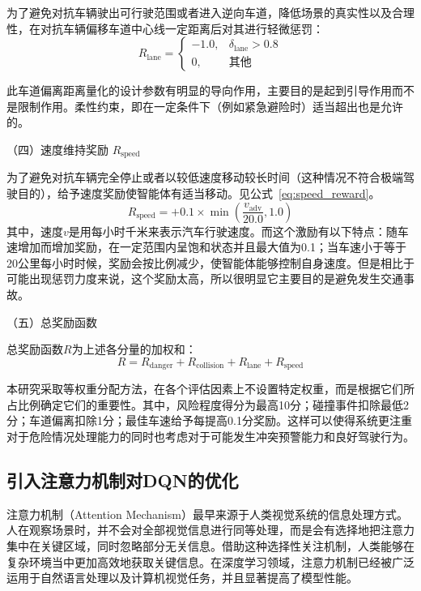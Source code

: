 为了避免对抗车辆驶出可行驶范围或者进入逆向车道，降低场景的真实性以及合理性，在对抗车辆偏移车道中心线一定距离后对其进行轻微惩罚：
\begin{equation}
R_{\text{lane}} =
\begin{cases}
-1.0, & \delta_{\text{lane}} > 0.8 \\
0, & \text{其他}
\end{cases}
\label{eq:lane_penalty}
\end{equation}

此车道偏离距离量化的设计参数有明显的导向作用，主要目的是起到引导作用而不是限制作用。柔性约束，即在一定条件下（例如紧急避险时）适当超出也是允许的。

（四）速度维持奖励 $R_{\text{speed}}$

为了避免对抗车辆完全停止或者以较低速度移动较长时间（这种情况不符合极端驾驶目的），给予速度奖励使智能体有适当移动。见公式~\ref{eq:speed_reward}。
\begin{equation}
R_{\text{speed}} = +0.1 \times \min\left( \frac{v_{\text{adv}}}{20.0}, 1.0 \right)
\label{eq:speed_reward}
\end{equation}
其中，速度$v$是用每小时千米来表示汽车行驶速度。而这个激励有以下特点：随车速增加而增加奖励，在一定范围内呈饱和状态并且最大值为0.1；当车速小于等于20公里每小时时候，奖励会按比例减少，使智能体能够控制自身速度。但是相比于可能出现惩罚力度来说，这个奖励太高，所以很明显它主要目的是避免发生交通事故。

（五）总奖励函数

总奖励函数$R$为上述各分量的加权和：
\begin{equation}
R = R_{\text{danger}} + R_{\text{collision}} + R_{\text{lane}} + R_{\text{speed}}
\label{eq:total_reward}
\end{equation}

本研究采取等权重分配方法，在各个评估因素上不设置特定权重，而是根据它们所占比例确定它们的重要性。其中，风险程度得分为最高10分；碰撞事件扣除最低2分；车道偏离扣除1分；最佳车速给予每提高0.1分奖励。这样可以使得系统更注重对于危险情况处理能力的同时也考虑对于可能发生冲突预警能力和良好驾驶行为。
\subsection{引入注意力机制对DQN的优化}
注意力机制（Attention Mechanism）最早来源于人类视觉系统的信息处理方式。人在观察场景时，并不会对全部视觉信息进行同等处理，而是会有选择地把注意力集中在关键区域，同时忽略部分无关信息。借助这种选择性关注机制，人类能够在复杂环境当中更加高效地获取关键信息。在深度学习领域，注意力机制已经被广泛运用于自然语言处理以及计算机视觉任务，并且显著提高了模型性能。

